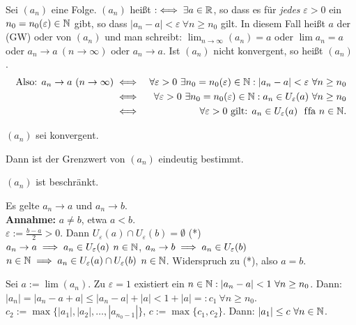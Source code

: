 \documentclass[a4paper,twoside,DIV15,BCOR12mm]{scrbook}
\begin{document}
\begin{definition}
Sei $(a_n)$ eine Folge. $(a_n)$ heißt  $:\iff \exists a \in \mathbb{R}$, so dass es für \textit{jedes} $\varepsilon > 0$ ein $n_0 = n_0(\varepsilon) \in \mathbb{N}$ gibt, so dass $|a_n - a| < \varepsilon \ \forall n \ge n_0$ gilt. In diesem Fall heißt $a$ der  (GW) oder  von $(a_n)$ und man schreibt: $\lim_{n \to \infty}(a_n) = a$ oder $\lim{a_n} = a$ oder $a_n \to a \ (n \to \infty)$ oder $a_n \to a$. Ist $(a_n)$ nicht konvergent, so heißt $(a_n)$ .
\begin{eqnarray*}
\text{Also: } a_n \to a \ (n \to \infty) 
  &\iff& \forall\varepsilon > 0 \ \exists n_0 = n_0(\varepsilon) \in\mathbb{N}: |a_n - a| < \varepsilon \ \forall n \ge n_0 \\
  &\iff& \forall\varepsilon > 0 \ \exists n_0 = n_0(\varepsilon) \in\mathbb{N}: a_n \in U_{\varepsilon}(a)\ \forall n \ge n_0 \\
  &\iff& \forall\varepsilon > 0 \text{ gilt: } a_n \in U_\varepsilon(a) \text{ \text{ f\/fa }} n \in \mathbb{N}.
\end{eqnarray*}
\end{definition}

\begin{satz}
$(a_n)$ sei konvergent.
\begin{liste}
\item Dann ist der Grenzwert von $(a_n)$ eindeutig bestimmt.
\item $(a_n)$ ist beschränkt.
\end{liste}
\end{satz}

\begin{beweise}
\item Es gelte $a_n \to a$ und $a_n \to b$. \\
\textbf{Annahme:} $a \ne b$, etwa $a < b$.\\
$\varepsilon := \frac{b-a}2 > 0$. Dann $U_\varepsilon(a) \cap U_\varepsilon(b) = \emptyset$ (*)\\
$a_n \to a \implies a_n \in U_\varepsilon(a) $ \ffa  $n \in \mathbb{N}$, $a_n \to b \implies a_n \in U_\varepsilon(b)$ \ffa $n \in \mathbb{N} \implies a_n \in U_\varepsilon(a) \cap U_\varepsilon(b)$ \ffa $n\in\mathbb{N}$. Widerspruch zu (*), also $a = b$.
\item Sei $a := \lim(a_n)$. Zu $\varepsilon = 1$ existiert ein $n\in\MdN: |a_n - a | < 1\ \forall n\ge n_0$. Dann: $|a_n| = |a_n - a + a| \le |a_n -a| + |a| < 1 + |a| =: c_1 \ \forall n \ge n_0$. $c_2 := \max\{|a_1|,|a_2|,\ldots,|a_{n_0-1}|\}$, $c := \max\{c_1,c_2\}$. Dann: $|a_1| \le c \ \forall n\in\mathbb{N}$.
\end{beweise}
\end{document}
